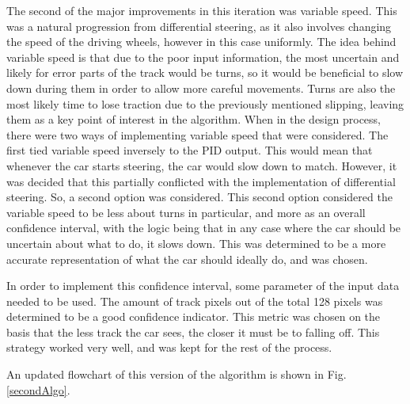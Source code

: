 \documentclass[conference]{IEEEtran}
\begin{document}
    The second of the major improvements in this iteration was variable speed. This was a natural progression from differential steering, as it also
    involves changing the speed of the driving wheels, however in this case uniformly.
    The idea behind variable speed is that due to the poor input information, the most uncertain and likely for error parts of the track would be turns,
    so it would be beneficial to slow down during them in order to allow more careful movements.
    Turns are also the most likely time to lose traction due to the previously mentioned slipping, leaving them as a key point of interest in the algorithm.
    When in the design process, there were two ways of implementing variable speed that were considered. The first tied variable speed inversely to the
    PID output.
    This would mean that whenever the car starts steering, the car would slow down to match.
    However, it was decided that this partially conflicted with the implementation of differential steering.
    So, a second option was considered.
    This second option considered the variable speed to be less about turns in particular, and more as an overall confidence interval, with the logic
    being that in any case where the car should be uncertain about what to do, it slows down.
    This was determined to be a more accurate representation of what the car should ideally do, and was chosen.

    In order to implement this confidence interval, some parameter of the input data needed to be used.
    The amount of track pixels out of the total 128 pixels was determined to be a good confidence indicator.
    This metric was chosen on the basis that the less track the car sees, the closer it must be to falling off.
    This strategy worked very well, and was kept for the rest of the process.

    An updated flowchart of this version of the algorithm is shown in Fig. \ref{secondAlgo}.
\end{document}
